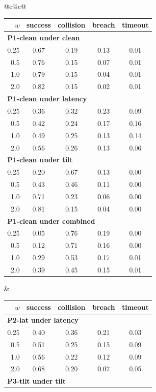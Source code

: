 \begin{tabular}{@{}c@{\hspace{1.5em}}c@{}}
\begin{tabular}[t]{rcccc}
\toprule
$w$ & success & collision & breach & timeout \\
\midrule
\multicolumn{5}{l}{\textbf{P1-clean under clean}} \\
0.25 & 0.67 & 0.19 & 0.13 & 0.01 \\
0.5 & 0.76 & 0.15 & 0.07 & 0.01 \\
1.0 & 0.79 & 0.15 & 0.04 & 0.01 \\
2.0 & 0.82 & 0.15 & 0.02 & 0.01 \\
\midrule
\multicolumn{5}{l}{\textbf{P1-clean under latency}} \\
0.25 & 0.36 & 0.32 & 0.23 & 0.09 \\
0.5 & 0.42 & 0.24 & 0.17 & 0.16 \\
1.0 & 0.49 & 0.25 & 0.13 & 0.14 \\
2.0 & 0.56 & 0.26 & 0.13 & 0.06 \\
\midrule
\multicolumn{5}{l}{\textbf{P1-clean under tilt}} \\
0.25 & 0.20 & 0.67 & 0.13 & 0.00 \\
0.5 & 0.43 & 0.46 & 0.11 & 0.00 \\
1.0 & 0.71 & 0.23 & 0.06 & 0.00 \\
2.0 & 0.81 & 0.15 & 0.04 & 0.00 \\
\midrule
\multicolumn{5}{l}{\textbf{P1-clean under combined}} \\
0.25 & 0.05 & 0.76 & 0.19 & 0.00 \\
0.5 & 0.12 & 0.71 & 0.16 & 0.00 \\
1.0 & 0.29 & 0.53 & 0.17 & 0.01 \\
2.0 & 0.39 & 0.45 & 0.15 & 0.01 \\
\bottomrule
\end{tabular}
&
\begin{tabular}[t]{rcccc}
\toprule
$w$ & success & collision & breach & timeout \\
\midrule
\multicolumn{5}{l}{\textbf{P2-lat under latency}} \\
0.25 & 0.40 & 0.36 & 0.21 & 0.03 \\
0.5 & 0.51 & 0.25 & 0.15 & 0.09 \\
1.0 & 0.56 & 0.22 & 0.12 & 0.09 \\
2.0 & 0.68 & 0.20 & 0.07 & 0.05 \\
\midrule
\multicolumn{5}{l}{\textbf{P3-tilt under tilt}} \\

\end{tabular}
\end{tabular}
